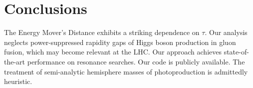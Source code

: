 \section{Conclusions}\label{sec:conclusions}

The Energy Mover's Distance exhibits a striking dependence on $\tau$.
Our analysis neglects power-suppressed rapidity gaps of Higgs boson
production in gluon fusion, which may become relevant at the LHC. Our
approach achieves state-of-the-art performance on resonance searches.
Our code is publicly available. The treatment of semi-analytic
hemisphere masses of photoproduction is admittedly heuristic.

